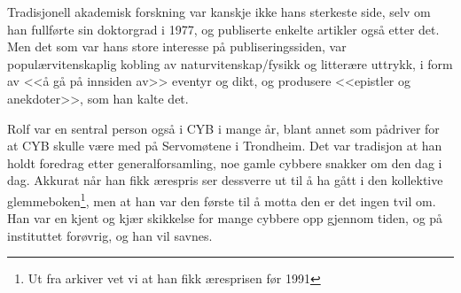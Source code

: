 Tradisjonell akademisk forskning var kanskje ikke hans sterkeste side, selv om han fullførte sin doktorgrad i 1977, og publiserte enkelte artikler også etter det. Men det som var hans store interesse på publiseringssiden, var populærvitenskaplig kobling av naturvitenskap\slash fysikk og litterære uttrykk, i form av <<å gå på innsiden av>> eventyr og dikt, og produsere <<epistler og anekdoter>>, som han kalte det.

Rolf var en sentral person også i CYB i mange år, blant annet som pådriver for at CYB skulle være med på Servomøtene i Trondheim. Det var tradisjon at han holdt foredrag etter generalforsamling, noe gamle cybbere snakker om den dag i dag. Akkurat når han fikk ærespris ser dessverre ut til å ha gått i den kollektive glemmeboken\footnote{Ut fra arkiver vet vi at han fikk æresprisen før 1991}, men at han var den første til å motta den er det ingen tvil om. Han var en kjent og kjær skikkelse for mange cybbere opp gjennom tiden, og på instituttet forøvrig, og han vil savnes.
